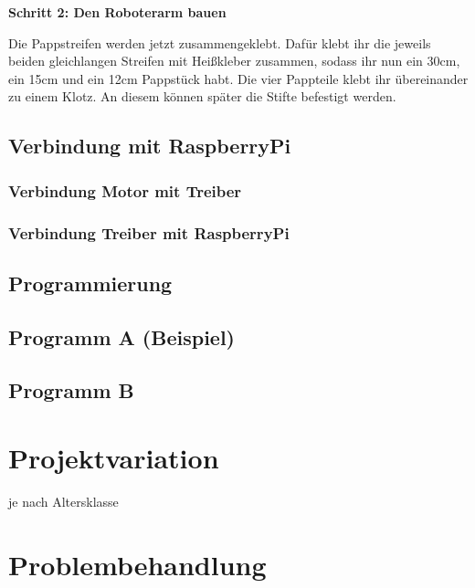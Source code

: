 \documentclass[12pt]{article}
\newcommand{\schritt}[3]{
\begin{tcolorbox}
  \textbf{Schritt #1: #2}
\end{tcolorbox}
#3
}
\begin{document}
\schritt{2}{Den Roboterarm bauen}{
Die Pappstreifen werden jetzt zusammengeklebt.
Dafür klebt ihr die jeweils beiden gleichlangen Streifen mit Heißkleber zusammen, sodass ihr nun ein 30cm, ein 15cm und ein 12cm Pappstück habt. 
Die vier Pappteile klebt ihr übereinander zu einem Klotz. An diesem können später die Stifte befestigt werden.\\
}


\subsection{Verbindung mit RaspberryPi}

\subsubsection{Verbindung Motor mit Treiber}
\subsubsection{Verbindung Treiber mit RaspberryPi}

\subsection{Programmierung}
\subsection{Programm A (Beispiel)}
\subsection{Programm B}


\section{Projektvariation}
je nach Altersklasse

\section{Problembehandlung}
\end{document}
